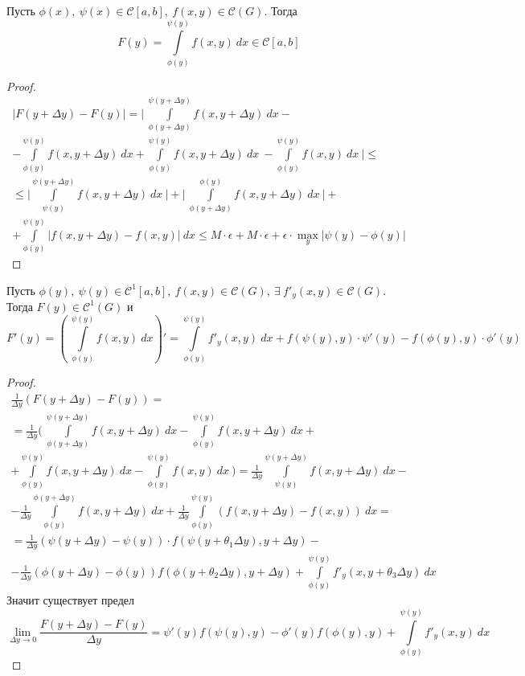 \begin{theorem}
    Пусть $\phi(x),\ \psi(x)\in \mathcal{C}[a,b],\ f(x,y)\in \mathcal{C}(G)$. Тогда
    \[F(y)=\int\limits_{\phi(y)}^{\psi(y)}f(x,y)\ dx\in \mathcal{C}[a,b]\]
\end{theorem}
\begin{proof}
    \begin{multline*}
        |F(y+\Delta y)-F(y)|=\Bigg|\ \int\limits_{\phi(y+\Delta y)}^{\psi(y+\Delta y)}f(x,y+\Delta y)\ dx-\\
        -\int\limits_{\phi(y)}^{\psi(y)}f(x,y+\Delta y)\ dx+\int\limits_{\phi(y)}^{\psi(y)}f(x,y+\Delta y)\ dx\ -\int\limits_{\phi(y)}^{\psi(y)}f(x,y)\ dx\ \Bigg|\leq\\
        \leq \Bigg|\int\limits_{\psi(y)}^{\psi(y+\Delta y)}f(x,y+\Delta y)\ dx\ \Bigg|+\Bigg|\ \int\limits_{\phi(y+\Delta y)}^{\phi(y)}f(x,y+\Delta y)\ dx\ \Bigg|+\\
        +\int\limits_{\phi(y)}^{\psi(y)}|f(x,y+\Delta y)-f(x,y)|\ dx\leq M\cdot \epsilon+M\cdot \epsilon+\epsilon\cdot \max\limits_{y}|\psi(y)-\phi(y)|
    \end{multline*}
    
\end{proof}
\begin{theorem}
    Пусть $\phi(y),\ \psi(y)\in \mathcal{C}^1[a,b],\ f(x,y)\in \mathcal{C}(G),\ \exists\ f'_y(x,y)\in \mathcal{C}(G)$. Тогда $F(y)\in \mathcal{C}^1(G)$ и
    \[F'(y)=\left(\ \int\limits_{\phi(y)}^{\psi(y)}f(x,y)\ dx\right)'=\int\limits_{\phi(y)}^{\psi(y)}f'_y(x,y)\ dx+f(\psi(y),y)\cdot \psi'(y)-f(\phi(y),y)\cdot \phi'(y)\]
\end{theorem}
\begin{proof}
    \begin{multline*}
        \frac{1}{\Delta y}(F(y+\Delta y)-F(y))=\\
        =\frac{1}{\Delta y}\Bigg(\ \int\limits_{\phi(y+\Delta y)}^{\psi(y+\Delta y)}f(x,y+\Delta y)\ dx-\int\limits_{\phi(y)}^{\psi(y)}f(x,y+\Delta y)\ dx+\\
        + \int\limits_{\phi(y)}^{\psi(y)}f(x,y+\Delta y)\ dx-\int\limits_{\phi(y)}^{\psi(y)}f(x,y)\ dx\ \Bigg)=\frac{1}{\Delta y}\int\limits_{\psi(y)}^{\psi(y+\Delta y)}f(x,y+\Delta y)\ dx-\\
        -\frac{1}{\Delta y}\int\limits_{\phi(y)}^{\phi(y+\Delta y)}f(x,y+\Delta y)\ dx +\frac{1}{\Delta y} \int\limits_{\phi(y)}^{\psi(y)}(f(x,y+\Delta y)-f(x,y))\ dx=\\
        =\frac{1}{\Delta y}(\psi(y+\Delta y)-\psi(y))\cdot f(\psi(y+\theta_1\Delta y), y+\Delta y)-\\
        -\frac{1}{\Delta y}(\phi(y+\Delta y)-\phi(y))f(\phi(y+\theta_2\Delta y), y+\Delta y)+\int\limits_{\phi(y)}^{\psi(y)}f'_y(x,y+\theta_3\Delta y)\ dx
    \end{multline*}
    Значит существует предел
    \[\lim\limits_{\Delta y\to 0}\frac{F(y+\Delta y)-F(y)}{\Delta y}=\psi'(y)f(\psi(y),y)-\phi'(y)f(\phi(y),y)+\int\limits_{\phi(y)}^{\psi(y)}f'_y(x,y)\ dx\]
\end{proof}
